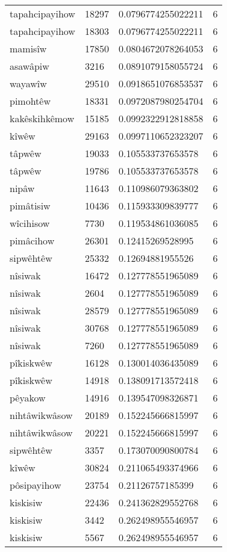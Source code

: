 \begin{longtable}{llll}
tapahcipayihow & 18297 & 0.0796774255022211 & 6 \\
tapahcipayihow & 18303 & 0.0796774255022211 & 6 \\
mamisîw & 17850 & 0.0804672078264053 & 6 \\
asawâpiw & 3216 & 0.0891079158055724 & 6 \\
wayawîw & 29510 & 0.0918651076853537 & 6 \\
pimohtêw & 18331 & 0.0972087980254704 & 6 \\
kakêskihkêmow & 15185 & 0.0992322912818858 & 6 \\
kîwêw & 29163 & 0.0997110652323207 & 6 \\
tâpwêw & 19033 & 0.105533737653578 & 6 \\
tâpwêw & 19786 & 0.105533737653578 & 6 \\
nipâw & 11643 & 0.110986079363802 & 6 \\
pimâtisiw & 10436 & 0.115933309839777 & 6 \\
wîcihisow & 7730 & 0.119534861036085 & 6 \\
pimâcihow & 26301 & 0.12415269528995 & 6 \\
sipwêhtêw & 25332 & 0.12694881955526 & 6 \\
nîsiwak & 16472 & 0.127778551965089 & 6 \\
nîsiwak & 2604 & 0.127778551965089 & 6 \\
nîsiwak & 28579 & 0.127778551965089 & 6 \\
nîsiwak & 30768 & 0.127778551965089 & 6 \\
nîsiwak & 7260 & 0.127778551965089 & 6 \\
pîkiskwêw & 16128 & 0.130014036435089 & 6 \\
pîkiskwêw & 14918 & 0.138091713572418 & 6 \\
pêyakow & 14916 & 0.139547098326871 & 6 \\
nihtâwikwâsow & 20189 & 0.152245666815997 & 6 \\
nihtâwikwâsow & 20221 & 0.152245666815997 & 6 \\
sipwêhtêw & 3357 & 0.173070090800784 & 6 \\
kîwêw & 30824 & 0.211065493374966 & 6 \\
pôsipayihow & 23754 & 0.21126757185399 & 6 \\
kiskisiw & 22436 & 0.241362829552768 & 6 \\
kiskisiw & 3442 & 0.262498955546957 & 6 \\
kiskisiw & 5567 & 0.262498955546957 & 6 \\

\end{longtable}
